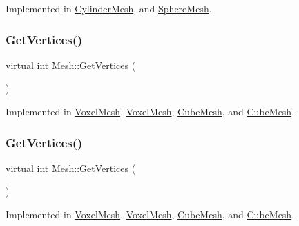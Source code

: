 Implemented in \mbox{\hyperlink{class_cylinder_mesh_a508ae2bf6117bc949b05d8b99b8aad34}{Cylinder\+Mesh}}, and \mbox{\hyperlink{class_sphere_mesh_a803470d419de41ffd75d6b932a819a06}{Sphere\+Mesh}}.

\mbox{\label{class_mesh_ad8480168123d9a70563b00cdbe7e73ed}} 
\subsubsection{\texorpdfstring{GetVertices()}{GetVertices()}\hspace{0.1cm}{\footnotesize\ttfamily [1/2]}}
{\footnotesize\ttfamily virtual int Mesh\+::\+Get\+Vertices (\begin{DoxyParamCaption}{ }\end{DoxyParamCaption})\hspace{0.3cm}{\ttfamily [pure virtual]}}



Implemented in \mbox{\hyperlink{class_voxel_mesh_a6a06be81275f5e98f77382ee9dfe9a07}{Voxel\+Mesh}}, \mbox{\hyperlink{class_voxel_mesh_a6a06be81275f5e98f77382ee9dfe9a07}{Voxel\+Mesh}}, \mbox{\hyperlink{class_cube_mesh_af86c2c0b5d36a8579904cad368ae381a}{Cube\+Mesh}}, and \mbox{\hyperlink{class_cube_mesh_af86c2c0b5d36a8579904cad368ae381a}{Cube\+Mesh}}.

\mbox{\label{class_mesh_ad8480168123d9a70563b00cdbe7e73ed}} 
\subsubsection{\texorpdfstring{GetVertices()}{GetVertices()}\hspace{0.1cm}{\footnotesize\ttfamily [2/2]}}
{\footnotesize\ttfamily virtual int Mesh\+::\+Get\+Vertices (\begin{DoxyParamCaption}{ }\end{DoxyParamCaption})\hspace{0.3cm}{\ttfamily [pure virtual]}}



Implemented in \mbox{\hyperlink{class_voxel_mesh_a6a06be81275f5e98f77382ee9dfe9a07}{Voxel\+Mesh}}, \mbox{\hyperlink{class_voxel_mesh_a6a06be81275f5e98f77382ee9dfe9a07}{Voxel\+Mesh}}, \mbox{\hyperlink{class_cube_mesh_af86c2c0b5d36a8579904cad368ae381a}{Cube\+Mesh}}, and \mbox{\hyperlink{class_cube_mesh_af86c2c0b5d36a8579904cad368ae381a}{Cube\+Mesh}}.

